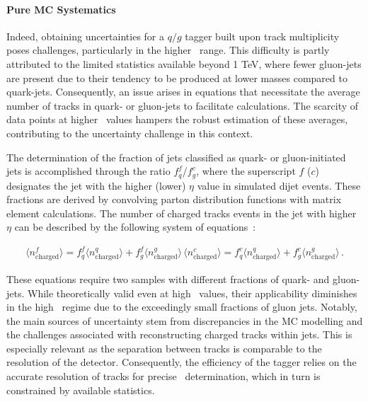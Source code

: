\paragraph{Pure MC Systematics}\mbox{}\par
Indeed, obtaining uncertainties for a $q/g$ tagger built upon track multiplicity poses challenges, particularly in the higher \pt\ range. This difficulty is partly attributed to the limited statistics available beyond 1 TeV, where fewer gluon-jets are present due to their tendency to be produced at lower masses compared to quark-jets. Consequently, an issue arises in equations that necessitate the average number of tracks in quark- or gluon-jets to facilitate calculations. The scarcity of data points at higher \pt\ values hampers the robust estimation of these averages, contributing to the uncertainty challenge in this context.

The determination of the fraction of jets classified as quark- or gluon-initiated jets is accomplished through the ratio $f^f_q$/$f^c_g$, where the superscript $f$ ($c$) designates the jet with the higher (lower) $\eta$ value in simulated dijet events. These fractions are derived by convolving parton distribution functions with matrix element calculations. The number of charged tracks events in the jet with higher $\eta$ can be described by the following system of equations~\cite{ATL-PHYS-PUB-2017-009}:

\begin{eqnarray}
\langle n^f_{\mathrm{charged}} \rangle = f^f_q \langle n^q_{\mathrm{charged}}\rangle + f^f_g\langle n^g_{\mathrm{charged}}\rangle\, 
\langle n^c_{\mathrm{charged}} \rangle = f^c_q \langle n^q_{\mathrm{charged}}\rangle + f^c_g\langle n^g_{\mathrm{charged}}\rangle\, .
\end{eqnarray}

These equations require two samples with different fractions of quark- and gluon-jets. While theoretically valid even at high \pt\ values, their applicability diminishes in the high \pt\ regime due to the exceedingly small fractions of gluon jets. Notably, the main sources of uncertainty stem from discrepancies in the MC modelling and the challenges associated with reconstructing charged tracks within jets. This is especially relevant as the separation between tracks is comparable to the resolution of the detector. Consequently, the efficiency of the tagger relies on the accurate resolution of tracks for precise \ntrk\ determination, which in turn is constrained by available statistics.

